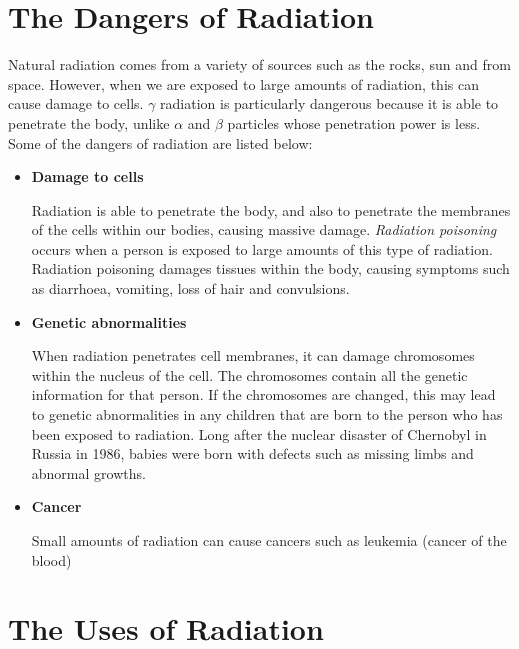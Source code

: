 



\section{The Dangers of Radiation}
\label{sec:an:dangers}

Natural radiation comes from a variety of sources such as the rocks, sun and from space. However, when we are exposed to large amounts of radiation, this can cause damage to cells. $\gamma$ radiation is particularly dangerous because it is able to penetrate the body, unlike $\alpha$ and $\beta$ particles whose penetration power is less. Some of the dangers of radiation are listed below:

\begin{itemize}
\item{\textbf{Damage to cells}}

Radiation is able to penetrate the body, and also to penetrate the membranes of the cells within our bodies, causing massive damage. \textit{Radiation poisoning} occurs when a person is exposed to large amounts of this type of radiation. Radiation poisoning damages tissues within the body, causing symptoms such as diarrhoea, vomiting, loss of hair and convulsions.

\item{\textbf{Genetic abnormalities}}

When radiation penetrates cell membranes, it can damage chromosomes within the nucleus of the cell. The chromosomes contain all the genetic information for that person. If the chromosomes are changed, this may lead to genetic abnormalities in any children that are born to the person who has been exposed to radiation. Long after the nuclear disaster of Chernobyl in Russia in 1986, babies were born with defects such as missing limbs and abnormal growths.

\item{\textbf{Cancer}}

Small amounts of radiation can cause cancers such as leukemia (cancer of the blood)

\end{itemize}






\section{The Uses of Radiation}
\label{sec:an:uses}


